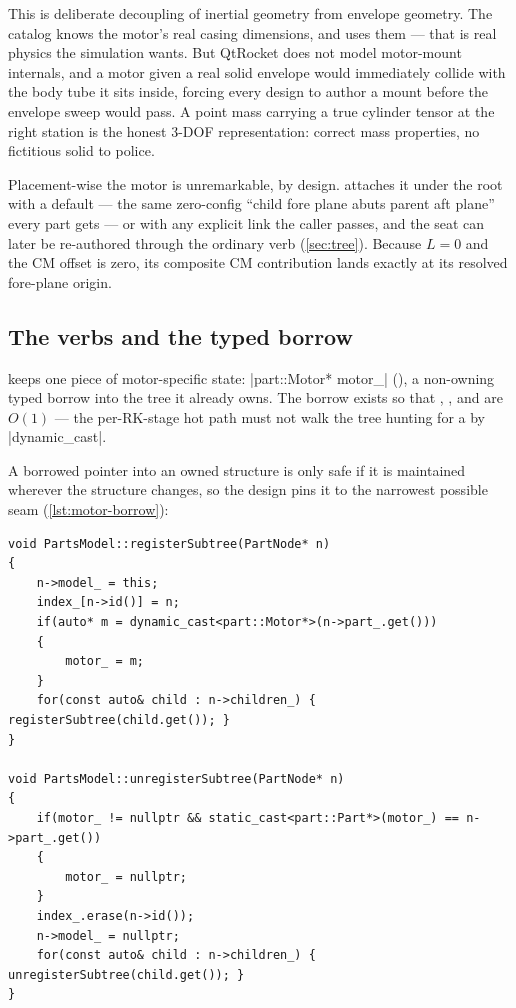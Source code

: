 This is deliberate decoupling of inertial geometry from envelope geometry. The catalog knows the
motor's real casing dimensions, and  uses them --- that is real physics the simulation
wants. But QtRocket does not model motor-mount internals, and a motor given a real solid envelope
would immediately collide with the body tube it sits inside, forcing every design to author a
mount before the envelope sweep would pass. A point mass carrying a true cylinder tensor at the
right station is the honest 3-DOF representation: correct mass properties, no fictitious solid to
police.

Placement-wise the motor is unremarkable, by design.  attaches it under the root
with a default  --- the same zero-config ``child fore plane abuts parent aft
plane'' every part gets --- or with any explicit link the caller passes, and the seat can later be
re-authored through the ordinary  verb (\cref{sec:tree}). Because $L = 0$ and the CM
offset is zero, its composite CM contribution lands exactly at its resolved fore-plane origin.

\subsection{The verbs and the typed borrow}\label{sec:motor-verbs}

 keeps one piece of motor-specific state: \cppinline|part::Motor* motor_|
(), a non-owning typed borrow into the tree it already owns. The
borrow exists so that , , and  are $O(1)$
--- the per-RK-stage hot path must not walk the tree hunting for a  by
\cppinline|dynamic_cast|.

A borrowed pointer into an owned structure is only safe if it is maintained wherever the structure
changes, so the design pins it to the narrowest possible seam (\cref{lst:motor-borrow}):

\begin{listing}[htbp]
\begin{verbatim}
void PartsModel::registerSubtree(PartNode* n)
{
    n->model_ = this;
    index_[n->id()] = n;
    if(auto* m = dynamic_cast<part::Motor*>(n->part_.get()))
    {
        motor_ = m;
    }
    for(const auto& child : n->children_) { registerSubtree(child.get()); }
}

void PartsModel::unregisterSubtree(PartNode* n)
{
    if(motor_ != nullptr && static_cast<part::Part*>(motor_) == n->part_.get())
    {
        motor_ = nullptr;
    }
    index_.erase(n->id());
    n->model_ = nullptr;
    for(const auto& child : n->children_) { unregisterSubtree(child.get()); }
}
\end{verbatim}
\caption{Borrow maintenance (). The same walk that
maintains the id index maintains the motor borrow; no structural verb touches the borrow
directly.}\label{lst:motor-borrow}
\end{listing}

